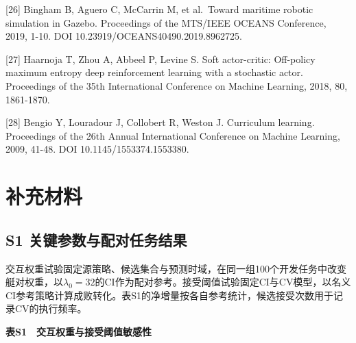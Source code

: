 \documentclass[UTF8,a4paper,zihao=5,fontset=none]{ctexart}
\begin{document}
{[}26{]} Bingham B, Aguero C, McCarrin M, et al.~Toward maritime robotic simulation in Gazebo. Proceedings of the MTS/IEEE OCEANS Conference, 2019, 1-10. DOI 10.23919/OCEANS40490.2019.8962725.

{[}27{]} Haarnoja T, Zhou A, Abbeel P, Levine S. Soft actor-critic: Off-policy maximum entropy deep reinforcement learning with a stochastic actor. Proceedings of the 35th International Conference on Machine Learning, 2018, 80, 1861-1870.

{[}28{]} Bengio Y, Louradour J, Collobert R, Weston J. Curriculum learning. Proceedings of the 26th Annual International Conference on Machine Learning, 2009, 41-48. DOI 10.1145/1553374.1553380.


\endgroup

\clearpage\section*{补充材料}

\subsection*{S1 关键参数与配对任务结果}

交互权重试验固定源策略、候选集合与预测时域，在同一组100个开发任务中改变艇对权重，以\(\lambda_0=32\)的CI作为配对参考。接受阈值试验固定CI与CV模型，以名义CI参考策略计算成败转化。表S1的净增量按各自参考统计，候选接受次数用于记录CV的执行频率。

\begin{center}\small\bfseries 表S1　交互权重与接受阈值敏感性\end{center}
\end{document}
